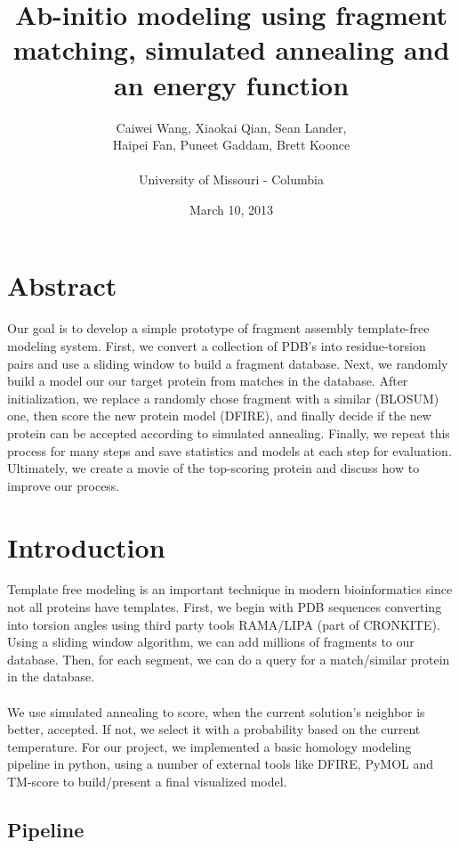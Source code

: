 \documentclass{article}
\title{Ab-initio modeling using fragment matching, simulated annealing and an energy function}
\author{Caiwei Wang, Xiaokai Qian, Sean Lander, \\Haipei Fan, Puneet Gaddam, Brett Koonce\\\\University of Missouri - Columbia}
\date{March 10, 2013}
\begin{document}
\maketitle

\section{Abstract}
Our goal is to develop a simple prototype of fragment assembly template-free modeling system. First, we convert a collection of PDB's into residue-torsion pairs and use a sliding window to build a fragment database. Next, we randomly build a model our our target protein from matches in the database. After initialization, we replace a randomly chose fragment with a similar (BLOSUM) one, then score the new protein model (DFIRE), and finally decide if the new protein can be accepted according to simulated annealing. Finally, we repeat this process for many steps and save statistics and models at each step for evaluation. Ultimately, we create a movie of the top-scoring protein and discuss how to improve our process.

\section{Introduction}

Template free modeling is an important technique in modern bioinformatics since not all proteins have templates. First, we begin with PDB sequences converting into torsion angles using third party tools RAMA/LIPA (part of CRONKITE). Using a sliding window algorithm, we can add millions of fragments to our database. Then, for each segment, we can do a query for a match/similar protein in the database.\\\\
We use simulated annealing to score, when the current solution’s neighbor is better, accepted. If not, we select it with a probability based on the current temperature. For our project, we implemented a basic homology modeling pipeline in python, using a number of external tools like DFIRE, PyMOL and TM-score to build/present a final visualized model.


\subsection{Pipeline}
\end{document}
